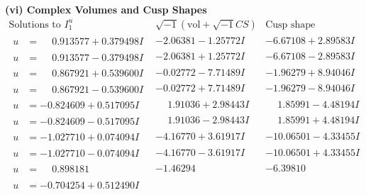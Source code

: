\documentclass[1p]{elsarticle_modified}
\theoremstyle{definition}
\newcommand{\I}{\sqrt{-1}}
\begin{document}
\newpage\flushleft \textbf{(vi) Complex Volumes and Cusp Shapes}
$$\begin{array}{c|c|c}  
\text{Solutions to }I^u_{1}& \I (\text{vol} + \sqrt{-1}CS) & \text{Cusp shape}\\
 \hline 
\begin{aligned}
u &= \phantom{-}0.913577 + 0.379498 I\end{aligned}
 & -2.06381 - 1.25772 I & -6.67108 + 2.89583 I \\ \hline\begin{aligned}
u &= \phantom{-}0.913577 - 0.379498 I\end{aligned}
 & -2.06381 + 1.25772 I & -6.67108 - 2.89583 I \\ \hline\begin{aligned}
u &= \phantom{-}0.867921 + 0.539600 I\end{aligned}
 & -0.02772 - 7.71489 I & -1.96279 + 8.94046 I \\ \hline\begin{aligned}
u &= \phantom{-}0.867921 - 0.539600 I\end{aligned}
 & -0.02772 + 7.71489 I & -1.96279 - 8.94046 I \\ \hline\begin{aligned}
u &= -0.824609 + 0.517095 I\end{aligned}
 & \phantom{-}1.91036 + 2.98443 I & \phantom{-}1.85991 - 4.48194 I \\ \hline\begin{aligned}
u &= -0.824609 - 0.517095 I\end{aligned}
 & \phantom{-}1.91036 - 2.98443 I & \phantom{-}1.85991 + 4.48194 I \\ \hline\begin{aligned}
u &= -1.027710 + 0.074094 I\end{aligned}
 & -4.16770 + 3.61917 I & -10.06501 - 4.33455 I \\ \hline\begin{aligned}
u &= -1.027710 - 0.074094 I\end{aligned}
 & -4.16770 - 3.61917 I & -10.06501 + 4.33455 I \\ \hline\begin{aligned}
u &= \phantom{-}0.898181\phantom{ +0.000000I}\end{aligned}
 & -1.46294\phantom{ +0.000000I} & -6.39810\phantom{ +0.000000I} \\ \hline\begin{aligned}
u &= -0.704254 + 0.512490 I\end{aligned}

\end{array}$$
\end{document}
